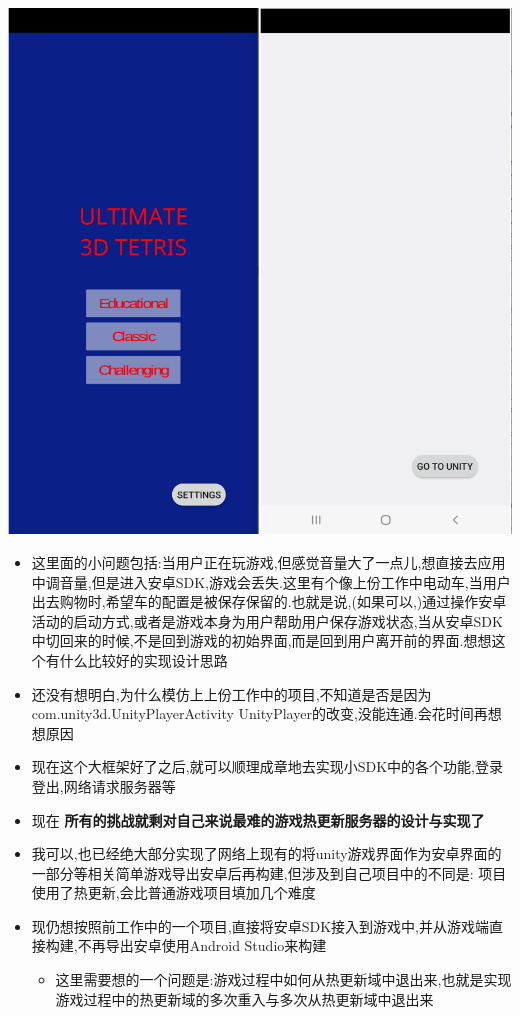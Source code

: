 \documentclass[9pt, b5paper]{article}
\begin{document}
\includegraphics[width=.9\linewidth]{./pic/notes_20221207_200732.png}
\begin{itemize}
\item 这里面的小问题包括:当用户正在玩游戏,但感觉音量大了一点儿,想直接去应用中调音量,但是进入安卓SDK,游戏会丢失.这里有个像上份工作中电动车,当用户出去购物时,希望车的配置是被保存保留的.也就是说,(如果可以,)通过操作安卓活动的启动方式,或者是游戏本身为用户帮助用户保存游戏状态,当从安卓SDK中切回来的时候,不是回到游戏的初始界面,而是回到用户离开前的界面.想想这个有什么比较好的实现设计思路
\item 还没有想明白,为什么模仿上上份工作中的项目,不知道是否是因为com.unity3d.UnityPlayerActivity UnityPlayer的改变,没能连通.会花时间再想想原因
\item 现在这个大框架好了之后,就可以顺理成章地去实现小SDK中的各个功能,登录登出,网络请求服务器等
\item 现在 \textbf{所有的挑战就剩对自己来说最难的游戏热更新服务器的设计与实现了}
\item 我可以,也已经绝大部分实现了网络上现有的将unity游戏界面作为安卓界面的一部分等相关简单游戏导出安卓后再构建,但涉及到自己项目中的不同是: 项目使用了热更新,会比普通游戏项目填加几个难度
\item 现仍想按照前工作中的一个项目,直接将安卓SDK接入到游戏中,并从游戏端直接构建,不再导出安卓使用Android Studio来构建 
\begin{itemize}
\item 这里需要想的一个问题是:游戏过程中如何从热更新域中退出来,也就是实现游戏过程中的热更新域的多次重入与多次从热更新域中退出来
\end{itemize}
\end{itemize}
\end{document}
